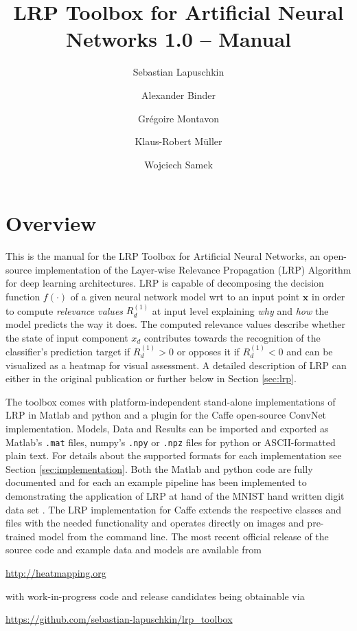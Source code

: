 \documentclass[a4wide]{article}
\newcommand{\x}{\boldsymbol{x}}
\begin{document}
\title{LRP Toolbox for Artificial Neural Networks 1.0 -- Manual}

\author{Sebastian Lapuschkin \and Alexander Binder \and Gr\'egoire Montavon \and Klaus-Robert M\"uller \and Wojciech Samek}

\maketitle

\tableofcontents

\newpage

\section{Overview}
This is the manual for the LRP Toolbox for Artificial Neural Networks, an open-source implementation of the Layer-wise Relevance Propagation (LRP)\cite{bach15} Algorithm for deep learning architectures. LRP is capable of decomposing the decision function $f(\cdot)$ of a given neural network model wrt to an input point $\x$ in order to compute \emph{relevance values} $R^{(1)}_d$ at input level explaining \emph{why} and \emph{how} the model predicts the way it does. The computed relevance values describe whether the state of input component $x_d$ contributes towards the recognition of the classifier's prediction target if $R^{(1)}_d > 0$ or opposes it if $R^{(1)}_d < 0$ and can be visualized as a heatmap for visual assessment. A detailed description of LRP can either in the original publication \cite{bach15} or further below in Section \ref{sec:lrp}.

The toolbox comes with platform-independent stand-alone implementations of LRP in Matlab and python and a plugin for the Caffe \cite{jia2014caffe} open-source ConvNet implementation. Models, Data and Results can be imported and exported as Matlab's \texttt{.mat} files, numpy's \texttt{.npy} or \texttt{.npz} files for python or ASCII-formatted plain text. For details about the supported formats for each implementation see Section \ref{sec:implementation}. Both the Matlab and python code are fully documented and for each an example pipeline has been implemented to demonstrating the application of LRP at hand of the MNIST hand written digit data set \cite{lecun1998mnist}.
The LRP implementation for Caffe extends the respective classes and files with the needed functionality and operates directly on images and pre-trained model from the command line.
The most recent official release of the source code and example data and models are available from 
\begin{center}
\url{http://heatmapping.org}
\end{center}
with work-in-progress code and release candidates being obtainable via
\begin{center}
\url{https://github.com/sebastian-lapuschkin/lrp_toolbox}
\end{center}
\end{document}
